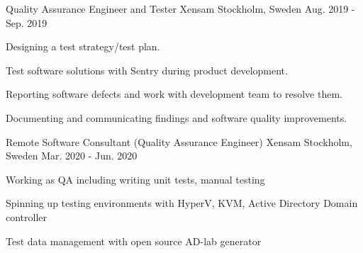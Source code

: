 \begin{cventries}
  \cventry
    {Quality Assurance Engineer and Tester} %
    {Xensam} %
    {Stockholm, Sweden} %
    {Aug. 2019 - Sep. 2019} %
    {
      \begin{cvitems} %
        \item {Designing a test strategy/test plan.}
        \item {Test software solutions with Sentry during product development.}
        \item {Reporting software defects and work with development team to resolve them.}
        \item {Documenting and communicating findings and software quality improvements.}
      \end{cvitems}
    }

  \cventry
    {Remote Software Consultant (Quality Assurance Engineer)} %
    {Xensam} %
    {Stockholm, Sweden} %
    {Mar. 2020 - Jun. 2020} %
    {
      \begin{cvitems} %
        \item {Working as QA including writing unit tests, manual testing}
        \item {Spinning up testing environments with HyperV, KVM, Active Directory Domain controller}
        \item {Test data management with open source AD-lab generator}
      \end{cvitems}
    }

 
\end{cventries}
